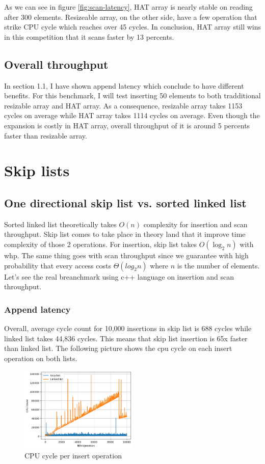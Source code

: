 \documentclass[a4paper, 12pt]{report}
\begin{document}
As we can see in figure \ref{fig:scan-latency}, HAT array is nearly stable on reading after 300 elements.
Resizeable array, on the other side, have a few operation that strike CPU cycle which reaches over 45 cycles.
In conclusion, HAT array still wins in this competition that it scans faster by 13 percents.

\section{Overall throughput}

In section 1.1, I have shown append latency which conclude to have different benefits.
For this benchmark, I will test inserting 50 elements to both tradditional resizable array and
HAT array. As a consequence, resizable array takes 1153 cycles on average while HAT array takes
1114 cycles on average. Even though the expansion is costly in HAT array, overall throughput
of it is around 5 percents faster than resizable array.


\chapter{Skip lists}

\section{One directional skip list vs. sorted linked list}

Sorted linked list theoretically takes $O(n)$ complexity for insertion and scan throughput. 
Skip list comes to take place in theory land that it improve time complexity of those 2 operations.
For insertion, skip list takes $O(\log_2 n)$ with whp. The same thing goes with scan throughput since
we guarantee with high probability that every access costs $\Theta(log_2 n)$ where $n$ is the number of elements.
Let's see the real breanchmark using c++ language on insertion and scan throughput.


\subsection{Append latency}
Overall, average cycle count for 10,000 insertions in skip list is 688 cycles while 
linked list takes 44,836 cycles. This means that skip list insertion is 65x faster than linked list.
The following picture shows the cpu cycle on each insert operation on both lists.

\begin{figure}[h]
        \centering
        \includegraphics[width=0.5\textwidth,scale=0.5]{skip_list_insert.png}
        \caption{\label{fig:skip_list_insert} CPU cycle per insert operation}
\end{figure}
\end{document}
